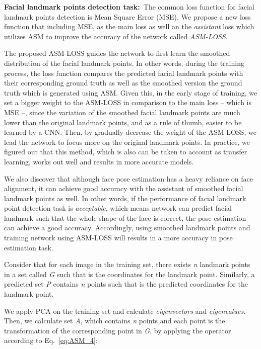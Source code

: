 \documentclass[final]{cvpr}
\begin{document}
\textbf{Facial landmark points detection task:}~The common loss function for facial landmark points detection is Mean Square Error (MSE). We propose a new loss function that including MSE, as the main loss as well an the \textit{assistant} loss which utilizes ASM to improve the accuracy of the network called \textit{ASM-LOSS}. 

The proposed ASM-LOSS guides the network to first learn the smoothed distribution of the facial landmark points. In other words, during the training process, the loss function compares the predicted facial landmark points with their corresponding ground truth as well as the smoothed version the ground truth which is generated using ASM. Given this, in the early stage of training, we set a bigger weight to the ASM-LOSS in comparison to the main loss -- which is MSE --, since the variation of the smoothed facial landmark points are much lower than the original landmark points, and as a rule of thumb, easier to be learned by a CNN. Then, by gradually decrease the weight of the ASM-LOSS, we lead the network to focus more on the original landmark points. In practice, we figured out that this method, which is also can be taken to account as transfer learning, works out well and results in more accurate models.

We also discover that although face pose estimation has a heavy reliance on face alignment, it can achieve good accuracy with the assistant of smoothed facial landmark points as well. In other words, if the performance of facial landmark point detection task is  \textit{acceptable}, which means network can predict facial landmark such that the whole shape of the face is correct, the pose estimation can achieve a good accuracy. Accordingly, using smoothed landmark points and training network using ASM-LOSS will results in a more accuracy in pose estimation task.

Consider that for each image in the training set, there exists \textit{n} landmark points in a set called \textit{G} such that  is the coordinates for the  landmark point. Similarly, a predicted set \textit{P} contains \textit{n} points such that  is the predicted coordinates for the  landmark point.



We apply PCA on the training set and calculate \textit{eigenvectors} and \textit{eigenvalues}. Then, we calculate set \textit{A}, which contains \textit{n} points and each point is the transformation of the corresponding point in \textit{G}, by applying the  operator according to Eq.~\ref{eq:ASM_4}:
\end{document}
